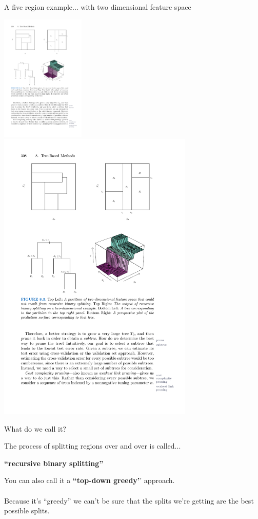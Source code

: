 \documentclass[mathserif, aspectratio=169]{beamer}
\begin{document}
\begin{frame}{A five region example... with two dimensional feature space}

\includegraphics[width=0.3\textwidth]{five_region_ex_map}
\includegraphics[width=0.7\textwidth]{five_region_ex}
\end{frame}

\begin{frame}{What do we call it?}

The process of splitting regions over and over is called...

\begin{center}
\textbf{``recursive binary splitting''}
\end{center}

You can also call it a \textbf{``top-down greedy'}' approach.  \\~\\

Because it's ``greedy'' we can't be sure that the splits we're getting are the best possible splits.  

\end{frame}
\end{document}
